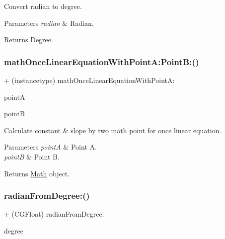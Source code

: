 Convert radian to degree.


\begin{DoxyParams}{Parameters}
{\em radian} & Radian.\\
\hline
\end{DoxyParams}
\begin{DoxyReturn}{Returns}
Degree. 
\end{DoxyReturn}
\mbox{\label{interface_math_a94d76076860ab2c7810202761246f557}} 
\subsubsection{\texorpdfstring{math\+Once\+Linear\+Equation\+With\+Point\+A\+:\+Point\+B\+:()}{mathOnceLinearEquationWithPointA:PointB:()}}
{\footnotesize\ttfamily + (instancetype) math\+Once\+Linear\+Equation\+With\+Point\+A\+: \begin{DoxyParamCaption}\item[{(\mbox{\hyperlink{struct_m_a_t_h_point}{M\+A\+T\+H\+Point}})}]{pointA }\item[{PointB:(\mbox{\hyperlink{struct_m_a_t_h_point}{M\+A\+T\+H\+Point}})}]{pointB }\end{DoxyParamCaption}}

Calculate constant \& slope by two math point for once linear equation.


\begin{DoxyParams}{Parameters}
{\em pointA} & Point A. \\
\hline
{\em pointB} & Point B.\\
\hline
\end{DoxyParams}
\begin{DoxyReturn}{Returns}
\mbox{\hyperlink{interface_math}{Math}} object. 
\end{DoxyReturn}
\mbox{\label{interface_math_adf1aa152458ba4692009473c03eb70b0}} 
\subsubsection{\texorpdfstring{radian\+From\+Degree\+:()}{radianFromDegree:()}}
{\footnotesize\ttfamily + (C\+G\+Float) radian\+From\+Degree\+: \begin{DoxyParamCaption}\item[{(C\+G\+Float)}]{degree }\end{DoxyParamCaption}}

